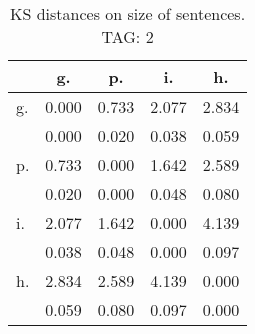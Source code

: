 \begin{table}[h!]
\begin{center}
\begin{tabular}{| l | c | c | c | c |}\hline
 & g. & p. & i. & h. \\\hline
g. & 0.000  & 0.733  & 2.077  & 2.834 \\\hline
 & 0.000  & 0.020  & 0.038  & 0.059 \\\hline
p. & 0.733  & 0.000  & 1.642  & 2.589 \\\hline
 & 0.020  & 0.000  & 0.048  & 0.080 \\\hline
i. & 2.077  & 1.642  & 0.000  & 4.139 \\\hline
 & 0.038  & 0.048  & 0.000  & 0.097 \\\hline
h. & 2.834  & 2.589  & 4.139  & 0.000 \\\hline
 & 0.059  & 0.080  & 0.097  & 0.000 \\\hline
\end{tabular}
\caption{KS distances on size of sentences. TAG: 2}
\end{center}
\end{table}